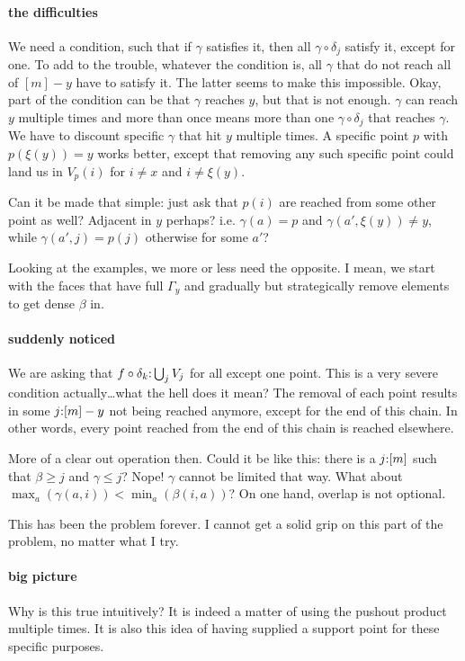 \documentclass[csh.tex]{subfiles}
\begin{document}
\paragraph{the difficulties}
We need a condition, such that if $\gamma$ satisfies it, then 
all $\gamma\circ \delta_j$ satisfy it, except for one.
To add to the trouble, whatever the condition is,
all $\gamma$ that do not reach all of $[m]-y$ have to satisfy it.
The latter seems to make this impossible.
Okay, part of the condition can be that $\gamma$ reaches $y$, but that is not
enough. $\gamma$ can reach $y$ multiple times and more than once means more 
than one $\gamma\circ \delta_j$ that reaches $\gamma$.
We have to discount specific $\gamma$ that hit $y$ multiple times.
A specific point $p$ with $p(\xi(y))=y$ works better, except that removing any 
such specific point could land us in $V_p(i)$ for $i\neq x$ and $i\neq \xi(y)$.

Can it be made that simple: just ask that $p(i)$ are reached from some other
point as well? Adjacent in $y$ perhaps? i.e. $\gamma(a) = p$ and 
$\gamma(a',\xi(y))\neq y$, while $\gamma(a',j) = p(j)$ otherwise for some $a'$?

Looking at the examples, we more or less need the opposite.
I mean, we start with the faces that have full $\Gamma_y$ and gradually but
strategically remove elements to get dense $\beta$ in.

\paragraph{suddenly noticed}
We are asking that $f\circ \delta_k\mathord : \bigcup_j V_j$ for all except one point.
This is a very severe condition actually\dots what the hell does it mean?
The removal of each point results in some $j\mathord : [m]-y$ not being reached 
anymore, except for the end of this chain. In other words, every point reached
from the end of this chain is reached elsewhere.

More of a clear out operation then.
Could it be like this: there is a $j\mathord : [m]$ such that $\beta \geq j$ and 
$\gamma \leq j$? Nope! $\gamma$ cannot be limited that way.
What about $\max_a(\gamma(a,i))<\min_a(\beta(i,a))$?
On one hand, overlap is not optional.

This has been the problem forever. I cannot get a solid grip on this part of the
problem, no matter what I try.

\paragraph{big picture}
Why is this true intuitively?
It is indeed a matter of using the pushout product multiple times.
It is also this idea of having supplied a support point for these
specific purposes.
\end{document}
